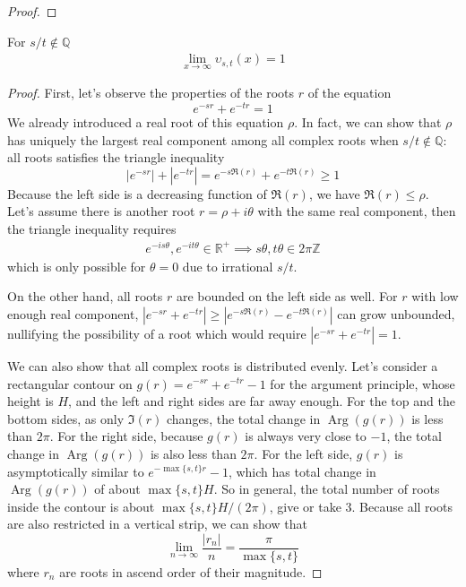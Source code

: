 \documentclass[]{article}
\DeclareMathOperator\Arg{Arg}
\begin{document}
\begin{proof}
\end{proof}

\vspace{1cm}
\begin{lemma}
	For $s/t\notin\mathbb{Q}$
	\begin{align*}
	\lim_{x\to\infty} \upsilon_{s,t}(x) = 1
	\end{align*}
\end{lemma}
\begin{proof}
First, let's observe the properties of the roots $r$ of the equation
\[
e^{-sr} + e^{-tr} = 1
\]
We already introduced a real root of this equation $\rho$. In fact, we can show that $\rho$ has uniquely the largest real component among all complex roots when $s/t\notin\mathbb{Q}$: all roots satisfies the triangle inequality
\[
|e^{-sr}| + |e^{-tr}| = e^{-s\Re(r)} + e^{-t\Re(r)} \ge 1
\]
Because the left side is a decreasing function of $\Re(r)$, we have $\Re(r) \le \rho$. Let's assume there is another root $r=\rho + i\theta$ with the same real component, then the triangle inequality requires
\begin{align*}
e^{-is\theta},e^{-it\theta}\in\mathbb{R^+}\implies  s\theta,t\theta\in2\pi\mathbb{Z}
\end{align*}
which is only possible for $\theta = 0$ due to irrational $s/t$.

On the other hand, all roots $r$ are bounded on the left side as well. For $r$ with low enough real component, $|e^{-sr} + e^{-tr}| \ge |e^{-s\Re(r)} - e^{-t\Re(r)}|$ can grow unbounded, nullifying the possibility of a root which would require  $|e^{-sr} + e^{-tr}|=1$.

We can also show that all complex roots is distributed evenly. Let's consider a rectangular contour on $g(r) = e^{-sr} + e^{-tr} - 1$ for the argument principle, whose height is $H$, and the left and right sides are far away enough. For the top and the bottom sides, as only $\Im(r)$ changes, the total change in $\Arg(g(r))$ is less than $2\pi$. For the right side, because $g(r)$ is always very close to $-1$, the total change in $\Arg(g(r))$ is also less than $2\pi$. For the left side, $g(r)$ is asymptotically similar to $e^{-\max\{s,t\}r}-1$, which has total change in $\Arg(g(r))$ of about $\max\{s,t\}H$. So in general, the total number of roots inside the contour is about $\max\{s,t\}H/(2\pi)$, give or take 3. Because all roots are also restricted in a vertical strip, we can show that
\[
\lim_{n\to\infty}\frac{|r_n|}{n} = \frac{\pi}{\max\{s,t\}}
\]
where $r_n$ are roots in ascend order of their magnitude.


\end{proof}
\end{document}
